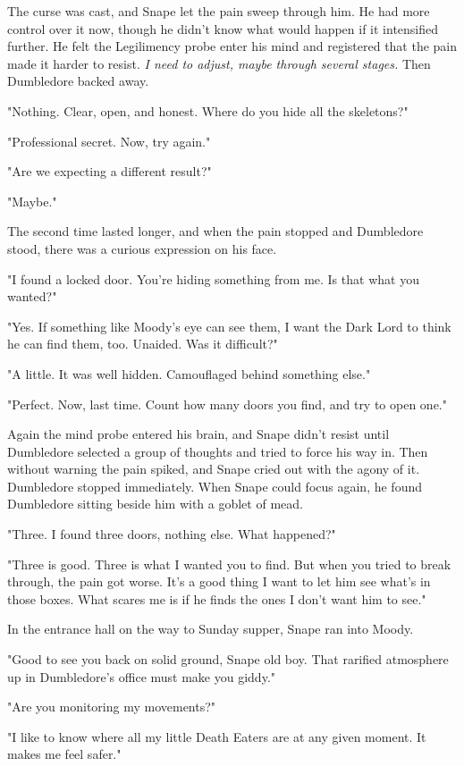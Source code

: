 \documentclass[a4paper,11pt]{article}
\begin{document}
The curse was cast, and Snape let the pain sweep through him. He had more control over it now, though he didn't know what would happen if it intensified further. He felt the Legilimency probe enter his mind and registered that the pain made it harder to resist. \emph{I need to adjust, maybe through several stages.} Then Dumbledore backed away.

"Nothing. Clear, open, and honest. Where do you hide all the skeletons?"

"Professional secret. Now, try again."

"Are we expecting a different result?"

"Maybe."

The second time lasted longer, and when the pain stopped and Dumbledore stood, there was a curious expression on his face.

"I found a locked door. You're hiding something from me. Is that what you wanted?"

"Yes. If something like Moody's eye can see them, I want the Dark Lord to think he can find them, too. Unaided. Was it difficult?"

"A little. It was well hidden. Camouflaged behind something else."

"Perfect. Now, last time. Count how many doors you find, and try to open one."

Again the mind probe entered his brain, and Snape didn't resist until Dumbledore selected a group of thoughts and tried to force his way in. Then without warning the pain spiked, and Snape cried out with the agony of it. Dumbledore stopped immediately. When Snape could focus again, he found Dumbledore sitting beside him with a goblet of mead.

"Three. I found three doors, nothing else. What happened?"

"Three is good. Three is what I wanted you to find. But when you tried to break through, the pain got worse. It's a good thing I want to let him see what's in those boxes. What scares me is if he finds the ones I don't want him to see."

In the entrance hall on the way to Sunday supper, Snape ran into Moody.

"Good to see you back on solid ground, Snape old boy. That rarified atmosphere up in Dumbledore's office must make you giddy."

"Are you monitoring my movements?"

"I like to know where all my little Death Eaters are at any given moment. It makes me feel safer."
\end{document}
